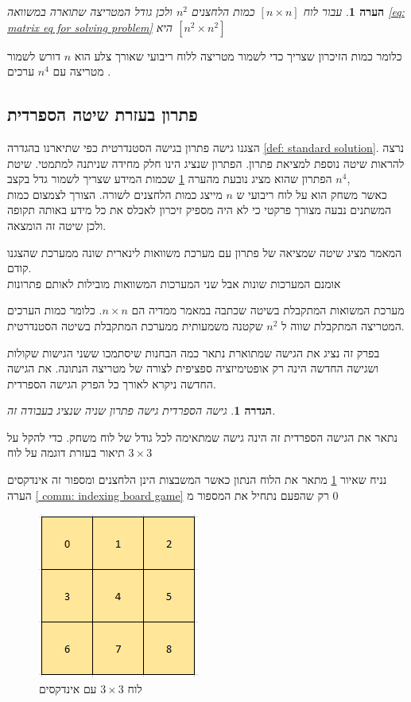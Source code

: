 \documentclass[12pt,twoside]{article}
\newtheorem{definition}{הגדרה}[section]
\newtheorem{comm}{הערה}[section]
\begin{document}
\begin{comm}
    \label{comm: for board too many variables}
    עבור לוח 
$[n \times n]$
כמות הלחצנים 
$n^2$
ולכן גודל המטריצה שתוארה במשוואה
\ref{eq: matrix eq for solving problem}
היא 
$[n^2 \times n^2]$
\end{comm}

כלומר כמות הזיכרון שצריך כדי לשמור מטריצה ללוח ריבועי שאורך צלע הוא
$n$
דורש לשמור מטריצה עם 
$n^4$
ערכים
.

\subsection{פתרון בעזרת שיטה הספרדית}
הצגנו גישה פתרון
בגישה הסטנדרטית 
כפי שתיארנו
בהגדרה
\ref{def: standard solution}.
נרצה להראות שיטה נוספת למציאת פתרון.
הפתרון שנציג הינו חלק מחידה שניתנה למתמטי.
שיטת הפתרון שהוא מציג נובעת מהערה 
\ref{comm: for board too many variables}
שכמות המידע שצריך לשמור גדל בקצב 
$n^4$,
\\
כאשר
משחק הוא על לוח ריבועי ש
$n$
מייצג
כמות הלחצנים לשורה.
הצורך לצמצום כמות המשתנים נבעה מצורך פרקטי כי לא היה מספיק זיכרון לאכלס את כל מידע 
באותה תקופה ולכן שיטה זה הומצאה.

המאמר 
\cite{B1}
מציג שיטה שמציאה של פתרון עם מערכת משוואות לינארית שונה ממערכת שהצגנו קודם.
\\
אומנם המערכות שונות אבל שני המערכות המשוואות מובילות לאותם פתרונות

מערכת המשואות המתקבלת בשיטה שכתבה במאמר 
\cite{B1}
ממדיה הם
$n \times n $.
כלומר כמות הערכים המטריצה המתקבלת שווה
ל
$n^2$
שקטנה משמעותית 
ממערכת המתקבלת בשיטה הסטנדרטית.

בפרק זה נציג את הגישה שמתוארת 
\cite{B1}
נתאר כמה הבחנות שיסתמכו ששני הגישות שקולות ושגישה החדשה הינה רק אופטימיזציה
ספציפית לצורה של מטריצה הנתונה.
את הגישה החדשה ניקרא לאורך כל הפרק הגישה הספרדית.

\begin{definition}
    \label{def: spanish way}
    גישה הספרדית גישה פתרון שניה שנציג בעבודה זה.
\end{definition}

נתאר את הגישה הספרדית 
זה הינה גישה שמתאימה לכל גודל של לוח משחק.
כדי להקל על תיאור 
בעזרת דוגמה על לוח 
$3 \times 3$

נניח שאיור 
\ref{fig: 3 x 3 board indexed}
מתאר את הלוח הנתון כאשר המשבצות הינן הלחצנים ומספור זה אינדקסים הערה 
\ref{ comm: indexing board game}
רק שהפעם נתחיל את המספור מ
$0$

\begin{figure}[ht]
    \caption{לוח 
    $3 \times 3$
    עם אינדקסים}
    \label{fig: 3 x 3 board indexed}
    \centering
    \includegraphics[width=.3\textwidth,height=.3\textheight,keepaspectratio]{images/3x3_board_index.PNG}
\end{figure}
\end{document}
